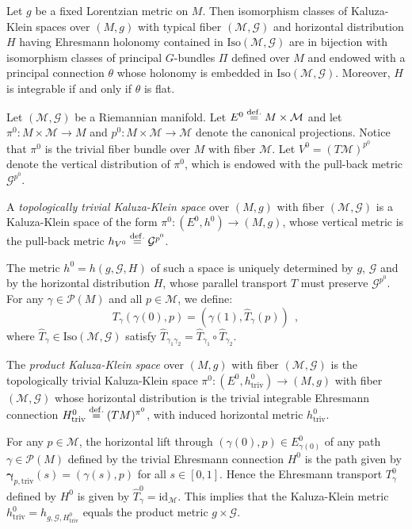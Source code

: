 \documentclass[10pt, cmp, numbook, final, a4paper]{svjour}
\newcommand{\eqdef}{\stackrel{{\rm def.}}{=}}
\newcommand{\ben}{\begin{equation}}
\newcommand{\een}{\end{equation}}
\newcommand{\id}{\mathrm{id}}
\newcommand{\cM}{\mathcal{M}}
\def\cP{\mathcal{P}}
\def\cG{\mathcal{G}}
\def\bgamma{\boldsymbol{\gamma}}
\def\Iso{\mathrm{Iso}}
\def\triv{\mathrm{triv}}
\begin{document}
\begin{proposition}
Let $g$ be a fixed Lorentzian metric on $M$. Then isomorphism classes
of Kaluza-Klein spaces over $(M,g)$ with typical fiber $(\cM,\cG)$ and
horizontal distribution $H$ having Ehresmann holonomy contained in
$\Iso(\cM,\cG)$ are in bijection with isomorphism classes of principal
$G$-bundles $\Pi$ defined over $M$ and endowed with a principal
connection $\theta$ whose holonomy is embedded in $\Iso(\cM,\cG)$. 
Moreover, $H$ is integrable if and only if $\theta$ is
flat.
\end{proposition}

\noindent
Let $(\cM,\cG)$ be a Riemannian manifold. Let $E^{0} \eqdef
M\times\cM$ and let $\pi^0:M\times \cM\rightarrow M$ and
$p^0:M\times\cM\rightarrow \cM$ denote the canonical
projections. Notice that $\pi^0$ is the trivial fiber bundle over $M$
with fiber $\cM$. Let $V^0=(T\cM)^{p^0}$ denote the vertical
distribution of $\pi^0$, which is endowed with the pull-back metric
$\cG^{p^0}$.

\begin{definition}
A {\em topologically trivial Kaluza-Klein space} over $(M,g)$ with
fiber $(\cM,\cG)$ is a Kaluza-Klein space of the form
$\pi^0:(E^0,h^{0})\rightarrow (M,g)$, whose vertical metric is the
pull-back metric $h_{V^0}\eqdef \cG^{p^0}$.
\end{definition}

\noindent 
The metric $h^{0}=h(g,\cG,H)$ of such a space is uniquely determined by
$g$, $\cG$ and by the horizontal distribution $H$, whose parallel
transport $T$ must preserve $\cG^{p^0}$. For any $\gamma\in \cP(M)$
and all $p\in \cM$, we define:
\ben
\label{hatT}
T_\gamma(\gamma(0),p)=(\gamma(1),{\hat T}_\gamma(p))~~, 
\een
where ${\hat T}_\gamma\in \Iso(\cM,\cG)$ satisfy ${\hat T}_{\gamma_1\gamma_2}={\hat T}_{\gamma_1}\circ {\hat T}_{\gamma_2}$.

\begin{definition}
The {\em product Kaluza-Klein space} over $(M,g)$ with fiber
$(\cM,\cG)$ is the topologically trivial Kaluza-Klein space
$\pi^0:(E^0,h^0_{\triv})\rightarrow (M,g)$ with fiber $(\cM,\cG)$
whose horizontal distribution is the trivial integrable Ehresmann
connection $H^0_{\triv} \eqdef (T M)^{\pi^0}$, with induced horizontal
metric $h^0_{\triv}$.
\end{definition}

\noindent 
For any $p\in \cM$, the horizontal lift through $(\gamma(0),p)\in
E^0_{\gamma(0)}$ of any path $\gamma\in \cP(M)$ defined by the
trivial Ehresmann connection $H^0$ is the path given by
$\bgamma_{p, \triv}(s)=(\gamma(s),p)$ for all $s\in [0,1]$. Hence the
Ehresmann transport $T^0_\gamma$ defined by $H^0$ is given by ${\hat
T}^0_{\gamma}=\id_{\cM}$.  This implies that the Kaluza-Klein metric
$h^0_{\triv}=h_{g, \cG, H^0_\triv}$ equals the product metric
$g\times \cG$.
\end{document}
